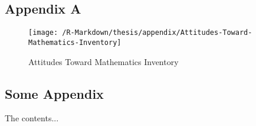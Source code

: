 \appendix
\section{Appendix A}
\label{app:atmi}
\begin{figure}

{\centering \texttt{[image: /R-Markdown/thesis/appendix/Attitudes-Toward-Mathematics-Inventory]} 
}

\caption{Attitudes Toward Mathematics Inventory}\label{fig:app:atmi}
\end{figure}


\begin{appendices}
\chapter{Some Appendix}
The contents...
\end{appendices}
